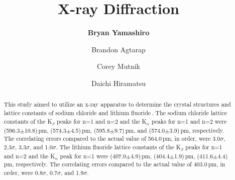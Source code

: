 \documentclass[aps,prl,twocolumn,superscriptaddress,nofootinbib]{revtex4-1}
\begin{document}





\title{X-ray Diffraction}


\author{\textbf{Bryan Yamashiro}}
\author{Brandon Agtarap}
\author{Corey Mutnik}
\author{Daichi Hiramatsu}






\begin{abstract}

This study aimed to utilize an x-ray apparatus to determine the crystal structures and lattice constants of sodium chloride and lithium fluoride\,\cite{1}. The sodium chloride lattice constants of the K$_\beta$ peaks for n=1 and n=2 and the K$_\alpha$ peaks for n=1 and n=2 were (596.3$\pm$10.8)\,pm, (574.3$\pm$4.5)\,pm, (595.8$\pm$9.7)\,pm, and (574.0$\pm$3.9)\,pm, respectively. The correlating errors compared to the actual value of 564.0\,pm, in order, were 3.0$\sigma$, 2.3$\sigma$, 3.3$\sigma$, and 1.0$\sigma$. The lithium fluoride lattice constants of the K$_\beta$ peaks for n=1 and n=2 and the K$_\alpha$ peak for n=1 were (407.0$\pm$4.9)\,pm, (404.4$\pm$1.9)\,pm, (411.6$\pm$4.4)\,pm, respectively. The correlating errors compared to the actual value of 403.0\,pm, in order, were 0.8$\sigma$, 0.7$\sigma$, and 1.9$\sigma$. 



\end{abstract}
\end{document}
